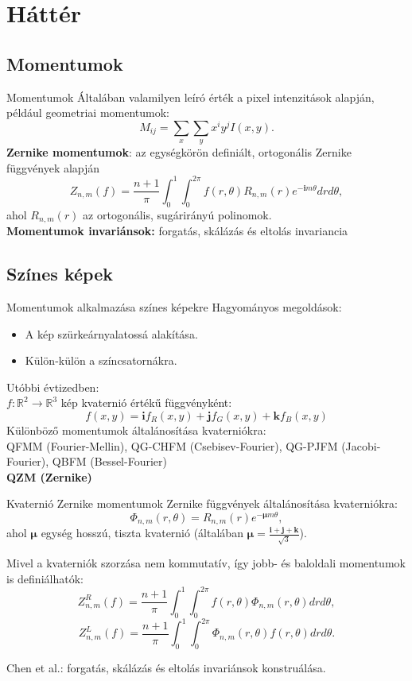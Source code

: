 \documentclass{beamer}
\newcommand{\R}{\mathbb{R}}
\newcommand{\qi}{\textbf{i}}
\newcommand{\qj}{\textbf{j}}
\newcommand{\qk}{\textbf{k}}
\newcommand{\qmu}{\boldsymbol{\mu}}
\def\R{{\mathbb R}}
\begin{document}
\section{Háttér}
\subsection{Momentumok}
\begin{frame}{Momentumok}
Általában valamilyen leíró érték a pixel intenzitások alapján, 
például geometriai momentumok: $$M_{ij} = \sum_x\sum_y x^i y^j I(x,y).$$
\textbf{Zernike momentumok}: az egységkörön definiált, ortogonális Zernike függvények alapján
$$Z_{n,m}(f) = \frac{n+1}{\pi}\int_0^1\int_0^{2\pi}f(r,\theta)R_{n,m}(r)e^{-\qi m\theta} dr d\theta,$$ ahol $R_{n,m}(r)$ az ortogonális, sugárirányú polinomok.\\

\textbf{Momentumok invariánsok:} forgatás, skálázás és eltolás invariancia 
\end{frame}

\subsection{Színes képek}
\begin{frame}{Momentumok alkalmazása színes képekre}
Hagyományos megoldások:
\begin{itemize}
    \item A kép szürkeárnyalatossá alakítása.
    \item Külön-külön a színcsatornákra.
\end{itemize}
Utóbbi évtizedben:\\
$f : \R^2 \rightarrow \R^3$ kép kvaternió értékű függvényként:
$$f(x,y) = \qi f_R(x,y) + \qj f_G(x,y) + \qk f_B(x,y)$$
Különböző momentumok általánosítása kvaterniókra:\\
QFMM (Fourier-Mellin), QG-CHFM (Csebisev-Fourier), QG-PJFM (Jacobi-Fourier), QBFM (Bessel-Fourier) \\
\textbf{QZM (Zernike)}
\end{frame}

\begin{frame}{Kvaternió Zernike momentumok}
Zernike függvények általánosítása kvaterniókra: $$\Phi_{n,m}(r,\theta) = R_{n,m}(r)e^{-\qmu m \theta},$$ ahol $\qmu$ egység hosszú, tiszta kvaternió (általában $\qmu = \frac{\qi + \qj + \qk}{\sqrt{3}}$).

Mivel a kvaterniók szorzása nem kommutatív, így jobb- és baloldali momentumok is definiálhatók:
$$Z^R_{n,m}(f) = \frac{n+1}{\pi}\int_0^1\int_0^{2\pi}f(r,\theta)\Phi_{n,m}(r,\theta) dr d\theta,$$
$$Z^L_{n,m}(f) = \frac{n+1}{\pi}\int_0^1\int_0^{2\pi}\Phi_{n,m}(r,\theta)f(r,\theta) dr d\theta.$$

Chen et al.: forgatás, skálázás és eltolás invariánsok konstruálása.
\end{frame}
\end{document}
